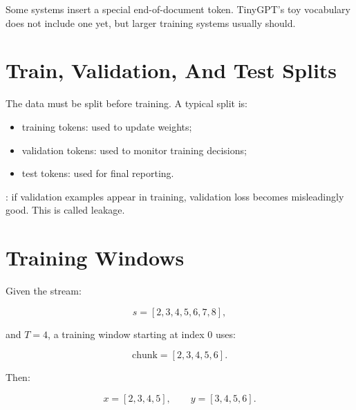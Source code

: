 Some systems insert a special end-of-document token. TinyGPT's toy vocabulary does not include one yet, but larger training systems usually should.

\section{Train, Validation, And Test Splits}

The data must be split before training. A typical split is:

\begin{itemize}
  \item training tokens: used to update weights;
  \item validation tokens: used to monitor training decisions;
  \item test tokens: used for final reporting.
\end{itemize}

\begin{center}
\end{center}

: if validation examples appear in training, validation loss becomes misleadingly good. This is called leakage.

\section{Training Windows}

Given the stream:

\[
s=[2,3,4,5,6,7,8],
\]

and \(T=4\), a training window starting at index 0 uses:

\[
\text{chunk}=[2,3,4,5,6].
\]

Then:

\[
x=[2,3,4,5],
\qquad
y=[3,4,5,6].
\]

